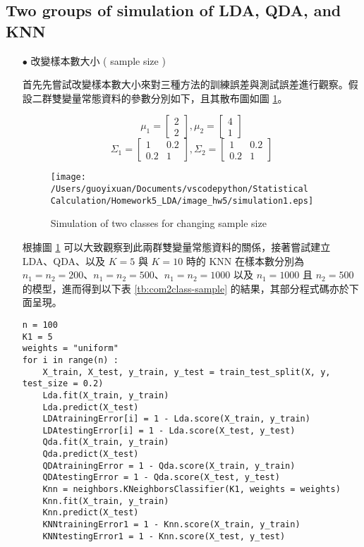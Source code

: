 \subsection{Two groups of simulation of LDA, QDA, and KNN}

\begin{itemize}
\item[$\bullet$] 改變樣本數大小 ( sample size )

首先先嘗試改變樣本數大小來對三種方法的訓練誤差與測試誤差進行觀察。假設二群雙變量常態資料的參數分別如下，且其散布圖如圖 \ref{fig:sample size}。

$$ \mu_1 = \left[
            \begin{array}{clr}
                2  \\
                2 
            \end{array} \right] ,
            \mu_2 = \left[
            \begin{array}{clr}
                4  \\
                1 
            \end{array} \right] $$ 
$$ \Sigma_1 = \left[
            \begin{array}{clr}
                1 & 0.2  \\
                0.2 & 1
            \end{array} \right] ,
            \Sigma_2 = \left[
            \begin{array}{clr}
                1 & 0.2  \\
                0.2 & 1 
            \end{array} \right]  $$

\begin{figure}[H]
    \centering
        \texttt{[image: /Users/guoyixuan/Documents/vscodepython/Statistical Calculation/Homework5\_LDA/image\_hw5/simulation1.eps]}
    \caption{Simulation of two classes for changing sample size}
    \label{fig:sample size}
\end{figure} 

根據圖 \ref{fig:sample size} 可以大致觀察到此兩群雙變量常態資料的關係，接著嘗試建立 LDA、QDA、以及 $K=5$ 與 $K=10$ 時的 KNN 在樣本數分別為 $n_1=n_2=200$、$n_1=n_2=500$、$n_1=n_2=1000$ 以及 $n_1=1000$ 且 $n_2=500$ 的模型，進而得到以下表 \ref{tb:com2class-sample} 的結果，其部分程式碼亦於下面呈現。

\bigskip
\begin{lstlisting}
n = 100
K1 = 5
weights = "uniform"
for i in range(n) :
    X_train, X_test, y_train, y_test = train_test_split(X, y, test_size = 0.2)
    Lda.fit(X_train, y_train)
    Lda.predict(X_test)
    LDAtrainingError[i] = 1 - Lda.score(X_train, y_train)
    LDAtestingError[i] = 1 - Lda.score(X_test, y_test)
    Qda.fit(X_train, y_train)
    Qda.predict(X_test)
    QDAtrainingError = 1 - Qda.score(X_train, y_train)
    QDAtestingError = 1 - Qda.score(X_test, y_test)
    Knn = neighbors.KNeighborsClassifier(K1, weights = weights)
    Knn.fit(X_train, y_train)
    Knn.predict(X_test)
    KNNtrainingError1 = 1 - Knn.score(X_train, y_train)
    KNNtestingError1 = 1 - Knn.score(X_test, y_test)


\end{lstlisting}
\end{itemize}
